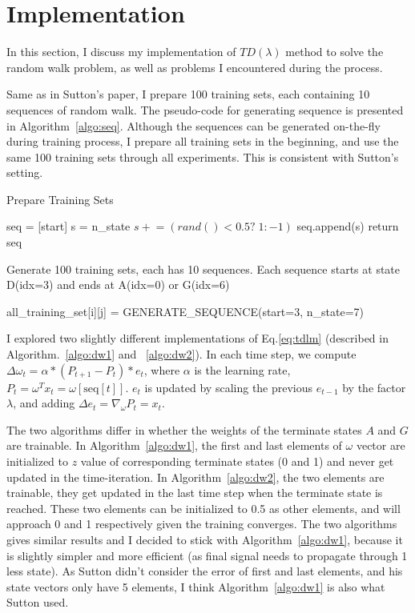 \documentclass[conference]{IEEEtran}
\newcommand{\pluseq}{\mathrel{+}=}
\begin{document}
	
	\section{Implementation}
	In this section, I discuss my implementation of $TD(\lambda)$ method to solve the random walk problem, as well as problems I encountered during the process.
	
	Same as in Sutton's paper, I prepare 100 training sets, each containing 10 sequences of random walk. The pseudo-code for generating sequence is presented in Algorithm~\ref{algo:seq}. Although the sequences can be generated on-the-fly during training process, I prepare all training sets in the beginning, and use the same 100 training sets through all experiments. This is consistent with Sutton's setting.
	
	
	\begin{algorithm}[h!]
		\caption{Prepare Training Sets}
		\begin{algorithmic}
			\State seq = [start]
			\State s = n\_state
			\State $s \pluseq (rand()<0.5?\; 1: -1)$
			\State seq.append(s)
			\EndWhile
			\State return seq
			\EndFunction
			
			\Comment Generate 100 training sets, each has 10 sequences. Each sequence starts at state D(idx=3) and ends at A(idx=0) or G(idx=6)
			
			\State all\_training\_set[i][j] = GENERATE\_SEQUENCE(start=3, n\_state=7)
			\EndFor
			\EndFor
			
		\end{algorithmic}
		\label{algo:seq}
	\end{algorithm}
	
	I explored two slightly different implementations of Eq.\ref{eq:tdlm} (described in Algorithm.~\ref{algo:dw1} and ~\ref{algo:dw2}). In each time step, we compute $\Delta \omega_t = \alpha * (P_{t+1}-P_t) * e_t$, where $\alpha$ is the learning rate, $P_t = \omega^T x_t = \omega[\mathrm{seq}[t]]$. $e_t$ is updated by scaling the previous $e_{t-1}$ by the factor $\lambda$, and adding $\Delta e_t = \nabla_\omega P_t = x_t$.
	
	The two algorithms differ in whether the weights of the terminate states $A$ and $G$ are trainable. In Algorithm~\ref{algo:dw1}, the first and last elements of $\omega$ vector are initialized to $z$ value of corresponding terminate states (0 and 1) and never get updated in the time-iteration. In Algorithm~\ref{algo:dw2}, the two elements are trainable, they get updated in the last time step when the terminate state is reached. These two elements can be initialized to 0.5 as other elements, and will approach 0 and 1 respectively given the training converges. The two algorithms gives similar results and I decided to stick with Algorithm~\ref{algo:dw1}, because it is slightly simpler and more efficient (as final signal needs to propagate through 1 less state). As Sutton didn't consider the error of first and last elements, and his state vectors only have 5 elements, I think Algorithm~\ref{algo:dw1} is also what Sutton used.
	
\end{document}
